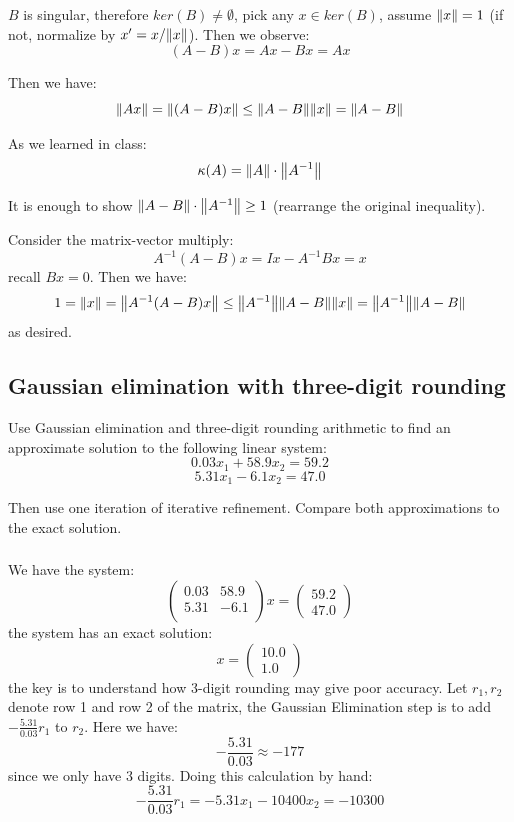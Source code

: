 \documentclass[12pt]{article} %
\newcommand{\ka}{\kappa}
\newcommand{\1}[1]{\mathds{1}\left[#1\right]}
\begin{document}
$B$ is singular, therefore $ker(B) \neq \emptyset$, pick any $x\in ker(B)$, assume $\norm{x} = 1$ (if not, normalize by $x' = x/\norm{x}$). Then we observe:
$$
	(A- B)x = Ax-Bx = Ax
$$

Then we have:
$$
	\norm{Ax} = \norm{(A-B)x} \le \norm{A-B}\norm{x} = \norm{A-B}
$$

As we learned in class:
$$
	\ka(A) = \norm{A}\cdot\norm{A^{-1}}
$$ 

It is enough to show $\norm{A-B}\cdot \norm{A^{-1}} \ge 1$ (rearrange the original inequality).

Consider the matrix-vector multiply:
$$
	A^{-1}(A-B)x= Ix - A^{-1}Bx = x
$$ recall $Bx = 0$. Then we have:
$$
	1=\norm{x} = \norm{A^{-1}(A-B)x} \le \norm{A^{-1}}\norm{A-B}\norm{x} = \norm{A^{-1}}\norm{A-B}
$$ as desired.








\newpage
\subsection{Gaussian elimination with three-digit rounding}
Use Gaussian elimination and three-digit rounding arithmetic to find an approximate solution to the following linear system:
$$
	0.03x_1 + 58.9x_2 = 59.2
$$
$$
	5.31x_1 - 6.1x_2 = 47.0
$$
	
Then use one iteration of iterative refinement. Compare both approximations to the
exact solution.

\subsubsection{}
We have the system:
$$
	\begin{pmatrix}
		0.03 & 58.9 \\
		5.31 & -6.1 \\
	\end{pmatrix}x =
	\begin{pmatrix}
		59.2 \\
		47.0
	\end{pmatrix}
$$ the system has an exact solution:
$$
	x = 
	\begin{pmatrix}
		10.0 \\
		1.0
	\end{pmatrix}
$$ the key is to understand how 3-digit rounding may give poor accuracy. Let $r_1, r_2$ denote row 1 and row 2 of the matrix, the Gaussian Elimination step is to add $-\frac{5.31}{0.03}r_1$ to $r_2$. Here we have:
$$
-\frac{5.31}{0.03}\approx -177
$$ since we only have 3 digits. Doing this calculation by hand:
$$
	-\frac{5.31}{0.03}r_1 = -5.31x_{1} - 10400x_{2} = -10300
$$
\end{document}
